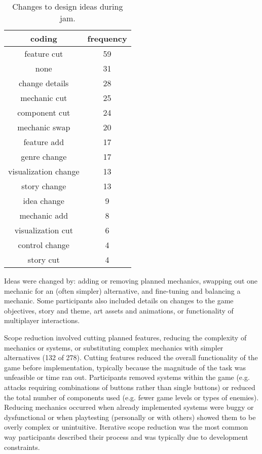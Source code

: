 \documentclass{sig-alternate}
\begin{document}
\begin{table}[tb]
\centering
\scriptsize
\begin{tabular}{|c|c|}
\hline coding & frequency \\ 
\hline feature cut & 59 \\ 
\hline none & 31 \\ 
\hline change details & 28 \\ 
\hline mechanic cut & 25 \\ 
\hline component cut & 24 \\ 
\hline mechanic swap & 20 \\ 
\hline feature add & 17 \\ 
\hline genre change & 17 \\ 
\hline visualization change & 13 \\ 
\hline story change & 13 \\ 
\hline idea change & 9 \\ 
\hline mechanic add & 8 \\ 
\hline visualization cut & 6 \\ 
\hline control change & 4 \\ 
\hline story cut & 4 \\ 
\hline 
\end{tabular} 
\caption{Changes to design ideas during jam.}
\label{tab:idea_changes}
\end{table}

Ideas were changed by: adding or removing planned mechanics, swapping out one mechanic for an (often simpler) alternative, and fine-tuning and balancing a mechanic. Some participants also included details on changes to the game objectives, story and theme, art assets and animations, or functionality of multiplayer interactions.

Scope reduction involved cutting planned features, reducing the complexity of mechanics or systems, or substituting complex mechanics with simpler alternatives (132 of 278).
Cutting features reduced the overall functionality of the game before implementation, typically because the magnitude of the task was unfeasible or time ran out. Participants removed systems within the game (e.g. attacks requiring combinations of buttons rather than single buttons) or reduced the total number of components used (e.g. fewer game levels or types of enemies).
Reducing mechanics occurred when already implemented systems were buggy or dysfunctional or when playtesting (personally or with others) showed them to be overly complex or unintuitive. 
Iterative scope reduction was the most common way participants described their process and was typically due to development constraints.
\end{document}
